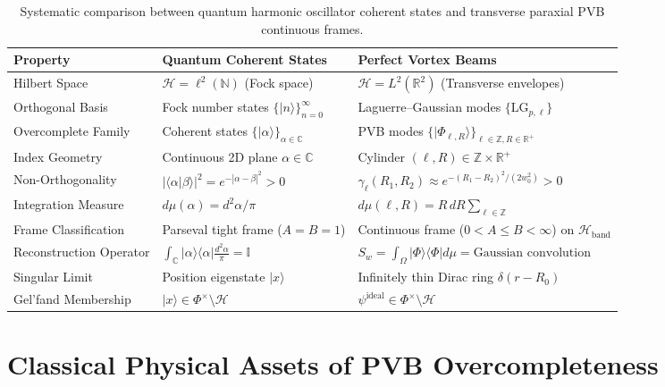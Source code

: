 \documentclass{optica-article}
\begin{document}
\begin{table}[htbp]
\centering
\caption{Systematic comparison between quantum harmonic oscillator coherent states and transverse paraxial PVB continuous frames.}
\label{tab:coherent_states}
\small
\begin{tabular}{lll}
\toprule
\textbf{Property} & \textbf{Quantum Coherent States} & \textbf{Perfect Vortex Beams} \\
\midrule
Hilbert Space & $\mathcal{H} = \ell^2(\mathbb{N})$ (Fock space) & $\mathcal{H} = L^2(\mathbb{R}^2)$ (Transverse envelopes) \\
Orthogonal Basis & Fock number states $\{|n\rangle\}_{n=0}^\infty$ & Laguerre--Gaussian modes $\{\text{LG}_{p, \ell}\}$ \\
Overcomplete Family & Coherent states $\{|\alpha\rangle\}_{\alpha \in \mathbb{C}}$ & PVB modes $\{|\Phi_{\ell, R}\rangle\}_{\ell \in \mathbb{Z}, R \in \mathbb{R}^+}$ \\
Index Geometry & Continuous 2D plane $\alpha \in \mathbb{C}$ & Cylinder $(\ell, R) \in \mathbb{Z} \times \mathbb{R}^+$ \\
Non-Orthogonality & $|\langle \alpha | \beta \rangle|^2 = e^{-|\alpha - \beta|^2} > 0$ & $\gamma_\ell(R_1, R_2) \approx e^{-(R_1 - R_2)^2 / (2w_0^2)} > 0$ \\
Integration Measure & $d\mu(\alpha) = d^2\alpha / \pi$ & $d\mu(\ell, R) = R \, dR \sum_{\ell \in \mathbb{Z}}$ \\
Frame Classification & Parseval tight frame ($A=B=1$) & Continuous frame ($0 < A \le B < \infty$) on $\mathcal{H}_{\text{band}}$ \\
Reconstruction Operator & $\int_\mathbb{C} |\alpha\rangle \langle \alpha| \frac{d^2\alpha}{\pi} = \mathbb{I}$ & $S_w = \int_\Omega |\Phi\rangle \langle \Phi| d\mu = \text{Gaussian convolution}$ \\
Singular Limit & Position eigenstate $|x\rangle$ & Infinitely thin Dirac ring $\delta(r - R_0)$ \\
Gel'fand Membership & $|x\rangle \in \Phi^\times \setminus \mathcal{H}$ & $\psi^{\text{ideal}} \in \Phi^\times \setminus \mathcal{H}$ \\
\bottomrule
\end{tabular}
\end{table}

\section{Classical Physical Assets of PVB Overcompleteness}
\label{sec:classical_assets}
\end{document}
